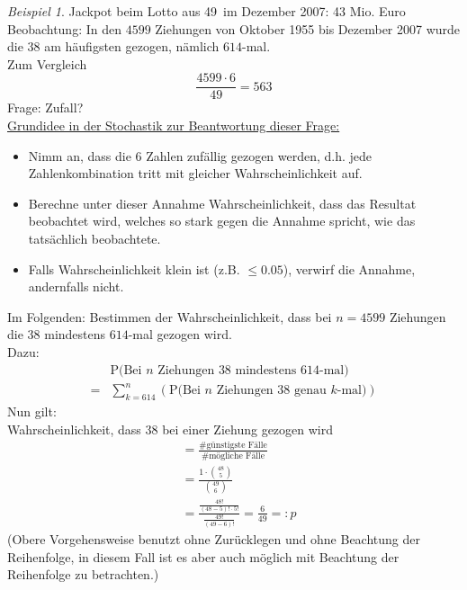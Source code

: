 \documentclass[a4paper,12pt,fleqn]{scrartcl}
\newcommand{\prob}[1]{\text{P(} #1 \text{)}}
\theoremstyle{definition}
\theoremstyle{plain}
\theoremstyle{remark}
\newtheorem{beispiel}[definition]{Beispiel}
\begin{document}
\begin{beispiel}
Jackpot beim Lotto  aus 49\grqq \, im Dezember 2007: 43 Mio. Euro \\
Beobachtung: In den $4599$ Ziehungen von Oktober 1955 bis Dezember 2007 wurde die $38$ am häufigsten gezogen, nämlich $614$-mal. \\
Zum Vergleich
\[\frac{4599 \cdot 6}{49} = 563\]
Frage: Zufall? \\
\underline{Grundidee in der Stochastik zur Beantwortung dieser Frage:}
\begin{itemize}
\item Nimm an, dass die $6$ Zahlen zufällig gezogen werden, d.h. jede Zahlenkombination tritt mit gleicher Wahrscheinlichkeit auf.
\item Berechne unter dieser Annahme Wahrscheinlichkeit, dass das Resultat beobachtet wird, welches so stark gegen die Annahme spricht, wie das tatsächlich beobachtete.
\item Falls Wahrscheinlichkeit klein ist (z.B. $\leq 0.05$), verwirf die Annahme, andernfalls nicht.
\end{itemize}
Im Folgenden: Bestimmen der Wahrscheinlichkeit, dass bei $n = 4599$ Ziehungen die $38$ mindestens $614$-mal gezogen wird. \\
Dazu:
\begin{align*}
&\prob{\text{Bei } n \text{ Ziehungen } 38 \text{ mindestens } 614 \text{-mal}}\\
= &\sum_{k = 614}^{n} (\prob{\text{Bei } n \text{ Ziehungen } 38 \text{ genau } k \text{-mal}})
\end{align*}
Nun gilt: \\
Wahrscheinlichkeit, dass $38$ bei einer Ziehung gezogen wird
\begin{align*}
&= \frac{ \text{\# günstigste Fälle}}{\text{\# mögliche Fälle}} \\
&= \frac{1 \cdot \binom{48}{5}}{\binom{49}{6}} \\
&= \frac{\frac{48!}{(48-5)! \cdot 5!}}{\frac{49!}{(49-6)!}} = \frac{6}{49} =: p
\end{align*}
(Obere Vorgehensweise benutzt ohne Zurücklegen und ohne Beachtung der Reihenfolge, in diesem Fall ist es aber auch möglich mit Beachtung der Reihenfolge zu betrachten.) \\


\end{beispiel}
\end{document}
